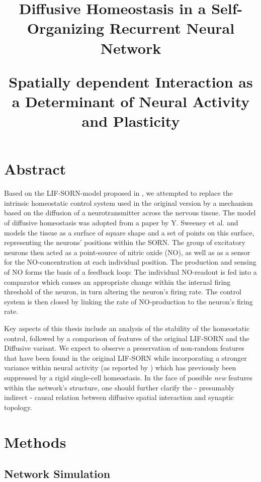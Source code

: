 \documentclass[10pt,a4paper]{article}
\title{Diffusive Homeostasis in a Self-Organizing Recurrent Neural Network \\
\begin{large}
Spatially dependent Interaction as a Determinant of Neural Activity and Plasticity
\end{large}
}
\begin{document}
\maketitle

\section{Abstract} \label{abstract}
Based on the LIF-SORN-model proposed in \cite{SORN_Paper}, we attempted to replace the intrinsic homeostatic control system used in the original version by a mechanism based on the diffusion of a neurotransmitter across the nervous tissue. The model of diffusive homeostasis was adopted from a paper by Y. Sweeney et al. \cite{Sweeney_Paper} and models the tissue as a surface of square shape and a set of points on this surface, representing the neurons' positions within the SORN. The group of excitatory neurons then acted as a point-source of nitric oxide (NO), as well as as a sensor for the NO-concentration at each individual position. The production and sensing of NO forms the basis of a feedback loop: The individual NO-readout is fed into a comparator which causes an appropriate change within the internal firing threshold of the neuron, in turn altering the neuron's firing rate. The control system is then closed by linking the rate of NO-production to the neuron's firing rate.

Key aspects of this thesis include an analysis of the stability of the homeostatic control, followed by a comparison of features of the original LIF-SORN and the Diffusive variant. We expect to observe a preservation of non-random features that have been found in the original LIF-SORN while incorporating a stronger variance within neural activity (as reported by \cite{Sweeney_Paper}) which has previously been suppressed by a rigid single-cell homeostasis. In the face of possible \emph{new} features within the network's structure, one should further clarify the - presumably indirect - causal relation between diffusive spatial interaction and synaptic topology. 





\section{Methods} \label{methods}
\subsection{Network Simulation}
\end{document}
